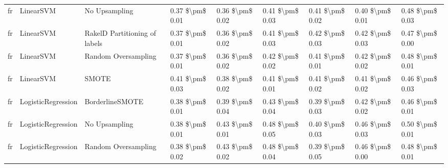 \begin{tabular}{lllllllll}
      fr &                       LinearSVM &                 No Upsampling & 0.37 \$\textbackslash pm\$ 0.01 &           0.36 \$\textbackslash pm\$ 0.02 &       0.41 \$\textbackslash pm\$ 0.03 &        0.41 \$\textbackslash pm\$ 0.02 &                         0.40 \$\textbackslash pm\$ 0.01 &     0.48 \$\textbackslash pm\$ 0.03 \\
      fr &                       LinearSVM & RakelD Partitioning of labels & 0.37 \$\textbackslash pm\$ 0.01 &           0.36 \$\textbackslash pm\$ 0.02 &       0.41 \$\textbackslash pm\$ 0.03 &        0.42 \$\textbackslash pm\$ 0.03 &                         0.42 \$\textbackslash pm\$ 0.03 &     0.47 \$\textbackslash pm\$ 0.00 \\
      fr &                       LinearSVM &           Random Oversampling & 0.37 \$\textbackslash pm\$ 0.01 &           0.36 \$\textbackslash pm\$ 0.02 &       0.42 \$\textbackslash pm\$ 0.02 &        0.41 \$\textbackslash pm\$ 0.01 &                         0.42 \$\textbackslash pm\$ 0.02 &     0.48 \$\textbackslash pm\$ 0.01 \\
      fr &                       LinearSVM &                         SMOTE & 0.41 \$\textbackslash pm\$ 0.03 &           0.38 \$\textbackslash pm\$ 0.02 &       0.41 \$\textbackslash pm\$ 0.01 &        0.41 \$\textbackslash pm\$ 0.02 &                         0.41 \$\textbackslash pm\$ 0.02 &     0.46 \$\textbackslash pm\$ 0.03 \\
      fr &              LogisticRegression &               BorderlineSMOTE & 0.38 \$\textbackslash pm\$ 0.01 &           0.39 \$\textbackslash pm\$ 0.04 &       0.43 \$\textbackslash pm\$ 0.04 &        0.39 \$\textbackslash pm\$ 0.03 &                         0.42 \$\textbackslash pm\$ 0.02 &     0.46 \$\textbackslash pm\$ 0.01 \\
      fr &              LogisticRegression &                 No Upsampling & 0.38 \$\textbackslash pm\$ 0.01 &           0.43 \$\textbackslash pm\$ 0.01 &       0.48 \$\textbackslash pm\$ 0.05 &        0.40 \$\textbackslash pm\$ 0.03 &                         0.46 \$\textbackslash pm\$ 0.03 &     0.50 \$\textbackslash pm\$ 0.01 \\
      fr &              LogisticRegression &           Random Oversampling & 0.38 \$\textbackslash pm\$ 0.02 &           0.43 \$\textbackslash pm\$ 0.02 &       0.48 \$\textbackslash pm\$ 0.04 &        0.39 \$\textbackslash pm\$ 0.05 &                         0.46 \$\textbackslash pm\$ 0.00 &     0.48 \$\textbackslash pm\$ 0.01 \\

\end{tabular}
